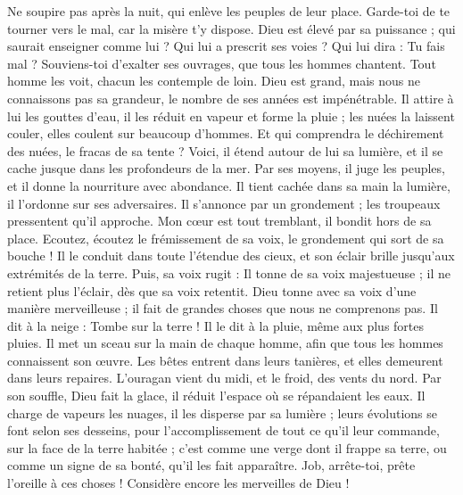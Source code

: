 \begin{multicols}{2}
Ne soupire pas après la nuit, qui enlève les peuples de leur place.
Garde-toi de te tourner vers le mal, car la misère t'y dispose.
Dieu est élevé par sa puissance ; qui saurait enseigner comme lui ?
Qui lui a prescrit ses voies ? Qui lui dira : Tu fais mal ?
Souviens-toi d'exalter ses ouvrages, que tous les hommes chantent.
Tout homme les voit, chacun les contemple de loin.
Dieu est grand, mais nous ne connaissons pas sa grandeur, le nombre de ses années est impénétrable.
Il attire à lui les gouttes d'eau, il les réduit en vapeur et forme la pluie ;
les nuées la laissent couler, elles coulent sur beaucoup d'hommes.
Et qui comprendra le déchirement des nuées, le fracas de sa tente ?
Voici, il étend autour de lui sa lumière, et il se cache jusque dans les profondeurs de la mer.
Par ses moyens, il juge les peuples, et il donne la nourriture avec abondance.
Il tient cachée dans sa main la lumière, il l'ordonne sur ses adversaires.
Il s'annonce par un grondement ; les troupeaux pressentent qu'il approche.
\VerseOne{}Mon cœur est tout tremblant, il bondit hors de sa place.
Ecoutez, écoutez le frémissement de sa voix, le grondement qui sort de sa bouche !
Il le conduit dans toute l'étendue des cieux, et son éclair brille jusqu'aux extrémités de la terre.
Puis, sa voix rugit : Il tonne de sa voix majestueuse ; il ne retient plus l'éclair, dès que sa voix retentit.
Dieu tonne avec sa voix d'une manière merveilleuse ; il fait de grandes choses que nous ne comprenons pas.
Il dit à la neige : Tombe sur la terre ! Il le dit à la pluie, même aux plus fortes pluies.
Il met un sceau sur la main de chaque homme, afin que tous les hommes connaissent son œuvre.
Les bêtes entrent dans leurs tanières, et elles demeurent dans leurs repaires.
L'ouragan vient du midi, et le froid, des vents du nord.
Par son souffle, Dieu fait la glace, il réduit l'espace où se répandaient les eaux.
Il charge de vapeurs les nuages, il les disperse par sa lumière ;
leurs évolutions se font selon ses desseins, pour l'accomplissement de tout ce qu'il leur commande, sur la face de la terre habitée ;
c'est comme une verge dont il frappe sa terre, ou comme un signe de sa bonté, qu'il les fait apparaître.
Job, arrête-toi, prête l'oreille à ces choses ! Considère encore les merveilles de Dieu !

\end{multicols}

